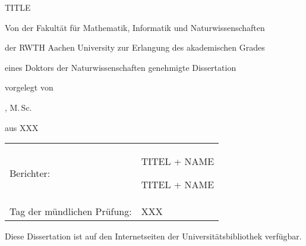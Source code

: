 
\begin{titlepage}%
  \setlength\parindent{0pt}%
  \centering%
  \null\vspace{2mm}%
  {\fontsize{17pt}{22pt}\selectfont%
  TITLE}\par
  \vspace{16mm}%
  \Large
  Von der Fakultät für Mathematik, Informatik und Naturwissenschaften\par
  der RWTH Aachen University zur Erlangung des akademischen Grades\par
  eines Doktors der Naturwissenschaften genehmigte Dissertation\par
  \vspace{32mm}%
  \large%
  vorgelegt von\par
  \vspace{3mm}%
  \LARGE%
  \theauthor, M.\,Sc.\par
  \vspace{4mm}%
  \large%
  aus XXX\par
  \vspace{34mm}%
  \begin{tabular}{l p{}}
    \large%
    Berichter: &
    TITEL + NAME\par
    TITEL + NAME\\[10mm]
    Tag der mündlichen Prüfung: & XXX
  \end{tabular}\par%
  \vspace*{36mm}%
  \normalsize%
  Diese Dissertation ist auf den Internetseiten der Universitätsbibliothek verfügbar.
\end{titlepage}
